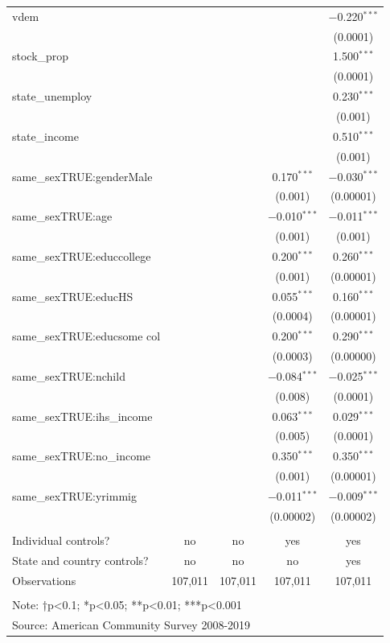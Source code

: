 \documentclass[
  11pt,
]{article}
\begin{document}
\begin{table}[!htbp]
\begin{tabular}{@{\extracolsep{5pt}}lcccc}
  vdem &  &  &  & $-$0.220$^{***}$ \\ 
  &  &  &  & (0.0001) \\ 
  stock\_prop &  &  &  & 1.500$^{***}$ \\ 
  &  &  &  & (0.0001) \\ 
  state\_unemploy &  &  &  & 0.230$^{***}$ \\ 
  &  &  &  & (0.001) \\ 
  state\_income &  &  &  & 0.510$^{***}$ \\ 
  &  &  &  & (0.001) \\ 
  same\_sexTRUE:genderMale &  &  & 0.170$^{***}$ & $-$0.030$^{***}$ \\ 
  &  &  & (0.001) & (0.00001) \\ 
  same\_sexTRUE:age &  &  & $-$0.010$^{***}$ & $-$0.011$^{***}$ \\ 
  &  &  & (0.001) & (0.001) \\ 
  same\_sexTRUE:educcollege &  &  & 0.200$^{***}$ & 0.260$^{***}$ \\ 
  &  &  & (0.001) & (0.00001) \\ 
  same\_sexTRUE:educHS &  &  & 0.055$^{***}$ & 0.160$^{***}$ \\ 
  &  &  & (0.0004) & (0.00001) \\ 
  same\_sexTRUE:educsome col &  &  & 0.200$^{***}$ & 0.290$^{***}$ \\ 
  &  &  & (0.0003) & (0.00000) \\ 
  same\_sexTRUE:nchild &  &  & $-$0.084$^{***}$ & $-$0.025$^{***}$ \\ 
  &  &  & (0.008) & (0.0001) \\ 
  same\_sexTRUE:ihs\_income &  &  & 0.063$^{***}$ & 0.029$^{***}$ \\ 
  &  &  & (0.005) & (0.0001) \\ 
  same\_sexTRUE:no\_income &  &  & 0.350$^{***}$ & 0.350$^{***}$ \\ 
  &  &  & (0.001) & (0.00001) \\ 
  same\_sexTRUE:yrimmig &  &  & $-$0.011$^{***}$ & $-$0.009$^{***}$ \\ 
  &  &  & (0.00002) & (0.00002) \\ 
 \hline \\[-1.8ex] 
Individual controls? & no & no & yes & yes \\ 
State and country controls? & no & no & no & yes \\ 
Observations & 107,011 & 107,011 & 107,011 & 107,011 \\ 
\hline 
\hline \\[-1.8ex] 
\multicolumn{5}{l}{Note: †p<0.1; *p<0.05; **p<0.01; ***p<0.001} \\ 
\multicolumn{5}{l}{Source: American Community Survey 2008-2019} \\ 
\end{tabular} 
\end{table}
\end{document}
